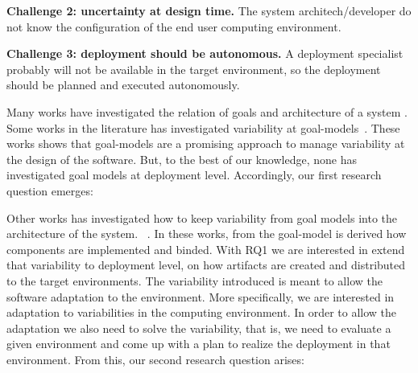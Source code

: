 \textbf{ Challenge 2: uncertainty at design time.} The system architech/developer do not know the configuration of the end user computing environment.

\textbf{ Challenge 3: deployment should be autonomous.} A deployment specialist probably will not be available in the target environment, so the deployment should be planned and executed autonomously.




Many works have investigated the relation of goals and architecture of a system \cite{van_lamsweerde_system_2003}\citep{penserini_design_2007}\cite{kramer_self-managed_2007}\cite{morandini_towards_2008}\cite{pimentel_deriving_2012}.
Some works in the literature has investigated variability at goal-models~\cite{yu_goals_2008}\cite{ali_requirements-driven_2014}\cite{angelopoulos_capturing_2015}. These works shows that goal-models are a promising approach to manage variability at the design of the software. But, to the best of our knowledge, none has investigated goal models at deployment level.
Accordingly, our first research question emerges:

 \setlength{\fboxsep}{10pt}
 \noindent{}\bigskip


Other works has investigated how to keep variability from goal models into the architecture of the system. ~\cite{yu_goals_2008}\cite{angelopoulos_capturing_2015}. In these works, from the goal-model is derived how components are implemented and binded. With RQ1 we are interested in extend that variability to deployment level, on how artifacts are created and distributed to the target environments. The variability introduced is meant to allow the software adaptation to the environment. More specifically, we are interested in adaptation to variabilities in the computing environment. In order to allow the adaptation we also need to solve the variability, that is, we need to evaluate a given environment and come up with a plan to realize the deployment in that environment. From this, our second research question arises:

\setlength{\fboxsep}{10pt}
\noindent{}\bigskip


